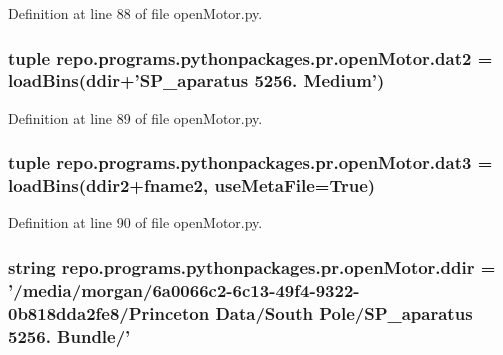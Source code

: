 Definition at line 88 of file open\-Motor.\-py.

\hypertarget{namespacerepo_1_1programs_1_1pythonpackages_1_1pr_1_1openMotor_a7e71c31c6f2be1f7dd4c5818fbc3b12e}{
\subsubsection[{dat2}]{\setlength{\rightskip}{0pt plus 5cm}tuple repo.\-programs.\-pythonpackages.\-pr.\-open\-Motor.\-dat2 = {\bf load\-Bins}({\bf ddir}+'S\-P\-\_\-aparatus 5256. Medium')}}\label{namespacerepo_1_1programs_1_1pythonpackages_1_1pr_1_1openMotor_a7e71c31c6f2be1f7dd4c5818fbc3b12e}


Definition at line 89 of file open\-Motor.\-py.

\hypertarget{namespacerepo_1_1programs_1_1pythonpackages_1_1pr_1_1openMotor_a7e9dd8e353fa85c7c0ecdda03da8d64e}{
\subsubsection[{dat3}]{\setlength{\rightskip}{0pt plus 5cm}tuple repo.\-programs.\-pythonpackages.\-pr.\-open\-Motor.\-dat3 = {\bf load\-Bins}({\bf ddir2}+{\bf fname2}, use\-Meta\-File=True)}}\label{namespacerepo_1_1programs_1_1pythonpackages_1_1pr_1_1openMotor_a7e9dd8e353fa85c7c0ecdda03da8d64e}


Definition at line 90 of file open\-Motor.\-py.

\hypertarget{namespacerepo_1_1programs_1_1pythonpackages_1_1pr_1_1openMotor_ab3fcb2684f3321af9bd6715fa1c12675}{
\subsubsection[{ddir}]{\setlength{\rightskip}{0pt plus 5cm}string repo.\-programs.\-pythonpackages.\-pr.\-open\-Motor.\-ddir = '/media/morgan/6a0066c2-\/6c13-\/49f4-\/9322-\/0b818dda2fe8/\-Princeton Data/\-South Pole/\-S\-P\-\_\-aparatus 5256. Bundle/'}}\label{namespacerepo_1_1programs_1_1pythonpackages_1_1pr_1_1openMotor_ab3fcb2684f3321af9bd6715fa1c12675}


